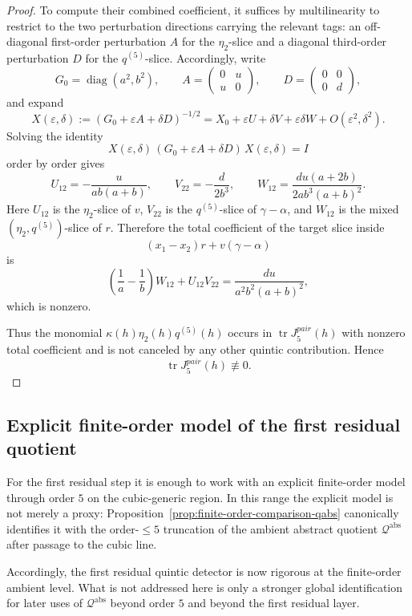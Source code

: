 \documentclass[11pt,a4paper]{amsart}
\def\pair{pair}%
\theoremstyle{plain}
\theoremstyle{definition}
\newcommand{\pair}{\mathrm{pair}}
\newcommand{\Qabs}{\mathcal Q^{\mathrm{abs}}}
\newcommand{\diag}{\operatorname{diag}}
\begin{document}
\begin{proof}
To compute their combined coefficient, it suffices by multilinearity to
restrict to the two perturbation directions carrying the relevant tags:
an off-diagonal first-order perturbation $A$ for the $\eta_2$-slice and
a diagonal third-order perturbation $D$ for the $q^{(5)}$-slice.
Accordingly, write
\[
G_0=\diag(a^2,b^2),
\qquad
A=
\begin{pmatrix}
0&u\\u&0
\end{pmatrix},
\qquad
D=
\begin{pmatrix}
0&0\\0&d
\end{pmatrix},
\]
and expand
\[
X(\varepsilon,\delta):=(G_0+\varepsilon A+\delta D)^{-1/2}
=
X_0+\varepsilon U+\delta V+\varepsilon\delta W+O(\varepsilon^2,\delta^2).
\]
Solving the identity
\[
X(\varepsilon,\delta)\,(G_0+\varepsilon A+\delta D)\,X(\varepsilon,\delta)=I
\]
order by order gives
\[
U_{12}=-\frac{u}{ab(a+b)},
\qquad
V_{22}=-\frac{d}{2b^3},
\qquad
W_{12}=\frac{du(a+2b)}{2ab^3(a+b)^2}.
\]
Here $U_{12}$ is the $\eta_2$-slice of $v$, $V_{22}$ is the
$q^{(5)}$-slice of $\gamma-\alpha$, and $W_{12}$ is the mixed
$(\eta_2,q^{(5)})$-slice of $r$. Therefore the total coefficient of the
target slice inside
\[
(x_1-x_2)r+v(\gamma-\alpha)
\]
is
\[
\left(\frac1a-\frac1b\right)W_{12}+U_{12}V_{22}
=
\frac{du}{a^2b^2(a+b)^2},
\]
which is nonzero.

Thus the monomial
$\kappa(h)\eta_2(h)q^{(5)}(h)$ occurs in
$\operatorname{tr}J_5^{\pair}(h)$ with nonzero total coefficient and is not
canceled by any other quintic contribution. Hence
\[
\operatorname{tr}J_5^{\pair}(h)\not\equiv 0.
\]
\end{proof}

\subsection{Explicit finite-order model of the first residual quotient}

For the first residual step it is enough to work with an explicit finite-order
model through order $5$ on the cubic-generic region. In this range the explicit
model is not merely a proxy: Proposition~\ref{prop:finite-order-comparison-qabs}
canonically identifies it with the order-$\le 5$ truncation of the ambient
abstract quotient $\Qabs$ after passage to the cubic line.

Accordingly, the first residual quintic detector is now rigorous at the
finite-order ambient level. What is not addressed here is only a stronger
global identification for later uses of $\Qabs$ beyond order $5$ and beyond the
first residual layer.
\end{document}
